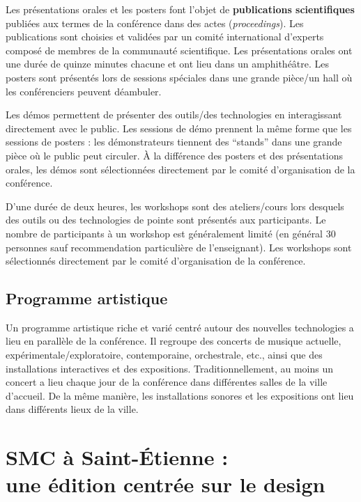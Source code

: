 \documentclass[fontsize=12pt]{scrartcl} %
\numberwithin{equation}{section} %
\numberwithin{figure}{section} %
\numberwithin{table}{section} %
\begin{document}
Les présentations orales et les posters font l'objet de \textbf{publications scientifiques} publiées aux termes de la conférence dans des actes (\textit{proceedings}). Les publications sont choisies et validées par un comité international d'experts composé de membres de la communauté scientifique. Les présentations orales ont une durée de quinze minutes chacune et ont lieu dans un amphithéâtre. Les posters sont présentés lors de sessions spéciales dans une grande pièce/un hall où les conférenciers peuvent déambuler. 

Les démos permettent de présenter des outils/des technologies en interagissant directement avec le public. Les sessions de démo prennent la même forme que les sessions de posters : les démonstrateurs tiennent des ``stands'' dans une grande pièce où le public peut circuler. À la différence des posters et des présentations orales, les démos sont sélectionnées directement par le comité d'organisation de la conférence.

D'une durée de deux heures, les workshops sont des ateliers/cours lors desquels des outils ou des technologies de pointe sont présentés aux participants. Le nombre de participants à un workshop est généralement limité (en général 30 personnes sauf recommendation particulière de l'enseignant). Les workshops sont sélectionnés directement par le comité d'organisation de la conférence.

\subsection{Programme artistique} 

Un programme artistique riche et varié centré autour des nouvelles technologies a lieu en parallèle de la conférence. Il regroupe des concerts de musique actuelle, expérimentale/exploratoire, contemporaine, orchestrale, etc., ainsi que des installations interactives et des expositions. Traditionnellement, au moins un concert a lieu chaque jour de la conférence dans différentes salles de la ville d'accueil. De la même manière, les installations sonores et les expositions ont lieu dans différents lieux de la ville.

\section{SMC à Saint-Étienne :\\une édition centrée sur le design}
\end{document}
